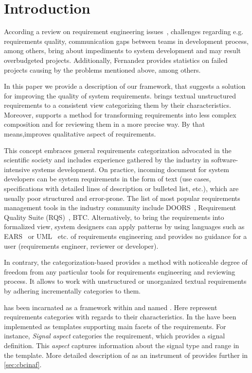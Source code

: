 \section{Introduction}
\label{sec:intro} 

According a review on requirement engineering issues~\cite{1Review}, challenges
regarding e.g. requirements quality, communication gaps between teams in
development process, among others, bring about impediments to system development
and may result overbudgeted projects. Additionally, Fernandez \cite{16NaPiRe}
provides statistics on failed projects causing by the problems mentioned above,
among others.


In this paper we provide a description of our framework,
that suggests a solution for improving the quality of system requirements.
\cc brings textual unstructured requirements to a consistent view categorizing
them by their characteristics. Moreover, \cc supports a method for transforming
requirements into less complex composition and for reviewing them in a more
precise way. By that means,\cbc improves qualitative aspect of requirements.

This concept embraces general requirements categorization advocated in the
scientific society and includes experience gathered by the industry in
software-intensive systems development. On practice, incoming document for
system developers can be system requirements in the form of text (use cases,
specifications with detailed lines of description or bulleted list, etc.), which
are usually poor structured and error-prone. The list of most popular
requirements management tools in the industry community include
DOORS~\cite{DOORS}, Requirement Quality Suite (RQS)~\cite{12RQS}, BTC.
Alternatively, to bring the requirements into formalized view, system designers
can apply patterns by using languages such as EARS~\cite{13EARS} or
UML~\cite{14UML} etc. %
of requirements engineering and provides no guidance for a user  (requirements
engineer, reviewer or developer).

In contrary, the \cbc categorization-based provides a method with noticeable
degree of freedom from any particular tools for requirements engineering and
reviewing process. It allows to work with unstructured or unorganized textual
requirements by adhering incrementally categories to them.

\cbc has been incarnated as a framework within \autof and named \asp. Here \asp
represent requirements categories with regards to their characteristics. In \af 
the \asp have been implemented as templates supporting main facets of the
requirements. For instance, \textit{Signal aspect} categories the requirement,
which provides a signal definition. This \textit{aspect} captures information
about the signal type and range in the template. More detailed description of
\asp as an instrument of \cc provides further in \autoref{sec:cbcinaf}.

